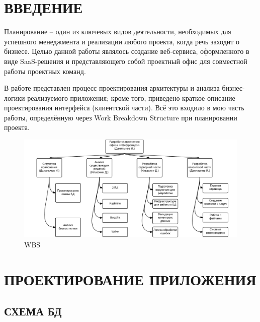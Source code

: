 \documentclass[14pt, a4paper]{extreport}
\begin{document}
\pagestyle{plain}


\newpage
\vspace*{-25mm}
\tableofcontents
\newpage


\chapter{\MakeTextUppercase{Введение}}
Планирование -- один из ключевых видов деятельности, необходимых для успешного менеджмента и реализации любого проекта, когда речь заходит о бизнесе. Целью данной работы являлось создание веб-сервиса, оформленного в виде SaaS-решения и представляющего собой проектный офис для совместной работы проектных команд.

В работе представлен процесс проектирования архитектуры и анализа бизнес-логики реализуемого приложения; кроме того, приведено краткое описание проектирования интерфейса (клиентской части). Всё это входило в мою часть работы, определённую через Work Breakdown Structure при планировании проекта.


\begin{figure}[!htb]
  \centering
    \includegraphics[scale=0.25]{../shared_images/wbs.png}
   \caption{WBS}
    \label{fig:start}
\end{figure}

\newpage

\chapter{\MakeTextUppercase{Проектирование приложения}}
\section{\MakeTextUppercase{Схема БД}}
\end{document}
